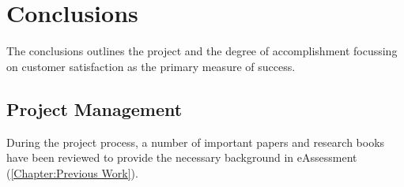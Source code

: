 \chapter{Conclusions} \label{Chapter: Conclusions}

\begin{preamble}
	The conclusions outlines the project and the degree of accomplishment focussing on customer satisfaction as the primary measure of success.
\end{preamble}


%
%
%
%
%
%

\section{Project Management}

During the project process, a number of important papers and research books have been reviewed to provide the necessary background in eAssessment (\autoref{Chapter:Previous Work}).

